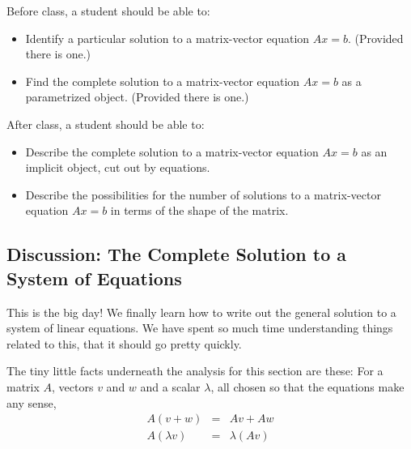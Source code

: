 \documentclass[10pt,]{book}
\theoremstyle{plain}
\numberwithin{equation}{section}
\begin{document}
      Before class, a student should be able to:
\begin{itemize}
\item{}
        Identify a particular solution to a matrix-vector equation \(Ax=b\).
        (Provided there is one.)
      \item{}
        Find the complete solution to a matrix-vector equation \(Ax=b\)
        as a parametrized object. (Provided there is one.)
      \end{itemize}
\par

      After class, a student should be able to:
\begin{itemize}
\item{}
        Describe the complete solution to a matrix-vector equation \(Ax=b\)
        as an implicit object, cut out by equations.
      \item{}
        Describe the possibilities for the number of solutions to a matrix-vector
        equation \(Ax=b\) in terms of the shape of the matrix.
      \end{itemize}
\typeout{************************************************}
\typeout{************************************************}
\subsection[
      Discussion: The Complete Solution to a System of Equations
    ]{
      Discussion: The Complete Solution to a System of Equations
    }\label{subsection-75}

      This is the big day! We finally learn how to write out the general
      solution to a system of linear equations. We have spent so much time
      understanding things related to this, that it should go pretty quickly.
\par

      The tiny little facts underneath the analysis for this section are
      these: For a matrix \(A\), vectors \(v\) and \(w\) and a scalar
      \(\lambda\), all chosen so that the equations make any sense,
      \[
        \begin{array}{rcl}
        A(v+w) &= &Av + Aw \\
        A(\lambda v) &= &\lambda ( Av )
        \end{array}
      \]
\par
\end{document}
